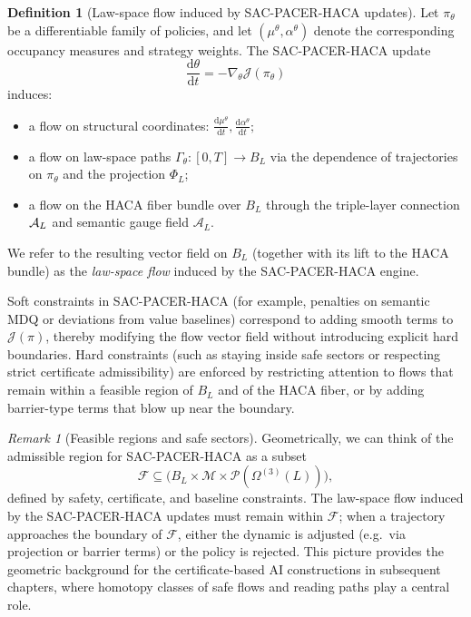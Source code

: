 \documentclass[11pt]{book}
\theoremstyle{plain}
\theoremstyle{definition}
\newtheorem{definition}[theorem]{Definition}
\theoremstyle{remark}
\newtheorem{remark}[theorem]{Remark}
\begin{document}
\begin{definition}[Law-space flow induced by SAC-PACER-HACA updates]
\label{def:lawspace-flow-sac-pacer-haca}
Let $\pi_\theta$ be a differentiable family of policies, and let
$(\mu^\theta,\alpha^\theta)$ denote the corresponding occupancy
measures and strategy weights. The SAC-PACER-HACA update
\[
  \frac{\mathrm{d}\theta}{\mathrm{d}t}
  = -\nabla_\theta\mathcal{J}(\pi_\theta)
\]
induces:
\begin{itemize}
  \item a flow on structural coordinates:
        \(
          \frac{\mathrm{d}\mu^\theta}{\mathrm{d}t},
          \frac{\mathrm{d}\alpha^\theta}{\mathrm{d}t};
        \)
  \item a flow on law-space paths $\Gamma_\theta:[0,T]\to B_L$ via the
        dependence of trajectories on $\pi_\theta$ and the projection
        $\Phi_L$;
  \item a flow on the HACA fiber bundle over $B_L$ through the
        triple-layer connection $\mathcal{A}_L$ and semantic gauge field
        $\mathcal{A}_L$.
\end{itemize}
We refer to the resulting vector field on $B_L$ (together with its
lift to the HACA bundle) as the \emph{law-space flow} induced by the
SAC-PACER-HACA engine.
\end{definition}

Soft constraints in SAC-PACER-HACA (for example, penalties on semantic
MDQ or deviations from value baselines) correspond to adding
smooth terms to $\mathcal{J}(\pi)$, thereby modifying the flow
vector field without introducing explicit hard boundaries. Hard
constraints (such as staying inside safe sectors or respecting strict
certificate admissibility) are enforced by restricting attention to
flows that remain within a feasible region of $B_L$ and of the HACA
fiber, or by adding barrier-type terms that blow up near the boundary.

\begin{remark}[Feasible regions and safe sectors]
\label{rem:feasible-region-safe-sectors}
Geometrically, we can think of the admissible region for SAC-PACER-HACA
as a subset
\[
  \mathcal{F}
  \subseteq
  \bigl(B_L\times\mathcal{M}\times\mathcal{P}(\Omega^{(3)}(L))\bigr),
\]
defined by safety, certificate, and baseline constraints. The law-space
flow induced by the SAC-PACER-HACA updates must remain within
$\mathcal{F}$; when a trajectory approaches the boundary of $\mathcal{F}$,
either the dynamic is adjusted (e.g.\ via projection or barrier
terms) or the policy is rejected. This picture provides the geometric
background for the certificate-based AI constructions in subsequent
chapters, where homotopy classes of safe flows and reading paths play
 a central role.
\end{remark}
\end{document}
